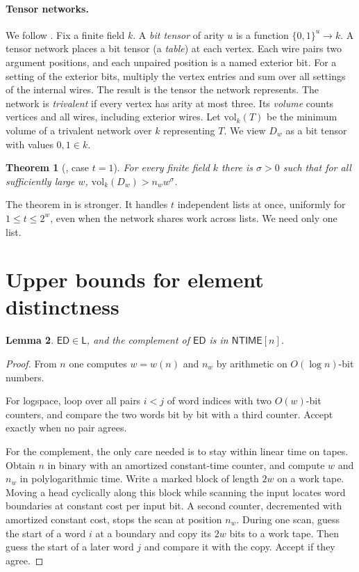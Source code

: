 \documentclass[11pt]{article}
\newtheorem{theorem}{Theorem}[section]
\newtheorem{lemma}[theorem]{Lemma}
\theoremstyle{definition}
\theoremstyle{remark}
\newcommand{\ED}{\mathsf{ED}}
\newcommand{\vol}{\mathrm{vol}}
\newcommand{\NTIME}{\mathsf{NTIME}}
\newcommand{\Lclass}{\mathsf{L}}
\begin{document}
\paragraph{Tensor networks.}
We follow \cite[Section~2.1]{OAI}. Fix a finite field $k$. A \emph{bit
tensor} of arity $u$ is a function $\{0,1\}^u\to k$. A tensor network
places a bit tensor (a \emph{table}) at each vertex. Each wire pairs two
argument positions, and each unpaired position is a named exterior bit.
For a setting of the exterior bits, multiply the vertex entries and sum
over all settings of the internal wires. The result is the tensor the
network represents. The network is \emph{trivalent} if every vertex has
arity at most three. Its \emph{volume} counts vertices and all wires,
including exterior wires. Let $\vol_k(T)$ be the minimum volume of a
trivalent network over $k$ representing $T$. We view $D_w$ as a bit
tensor with values $0,1\in k$.

\begin{theorem}[{\cite[Theorem~2.2]{OAI}}, case $t=1$]\label{thm:import}
For every finite field $k$ there is $\sigma>0$ such that for all
sufficiently large $w$, $\vol_k(D_w)>n_w w^{\sigma}$.
\end{theorem}

The theorem in \cite{OAI} is stronger. It handles $t$ independent lists
at once, uniformly for $1\le t\le 2^w$, even when the network shares work
across lists. We need only one list.

\section{Upper bounds for element distinctness}
\begin{lemma}\label{lem:uniform}
$\ED\in\Lclass$, and the complement of $\ED$ is in $\NTIME[n]$.
\end{lemma}
\begin{proof}
From $n$ one computes $w=w(n)$ and $n_w$ by arithmetic on
$O(\log n)$-bit numbers.

For logspace, loop over all pairs $i<j$ of word indices with two
$O(w)$-bit counters, and compare the two words bit by bit with a third
counter. Accept exactly when no pair agrees.

For the complement, the only care needed is to stay within linear time
on tapes. Obtain $n$ in binary with an amortized constant-time counter,
and compute $w$ and $n_w$ in polylogarithmic time. Write a marked block
of length $2w$ on a work tape. Moving a head cyclically along this block
while scanning the input locates word boundaries at constant cost per
input bit. A second counter, decremented with amortized constant cost,
stops the scan at position $n_w$. During one scan, guess the start of a
word $i$ at a boundary and copy its $2w$ bits to a work tape. Then guess
the start of a later word $j$ and compare it with the copy. Accept if
they agree.
\end{proof}
\end{document}
